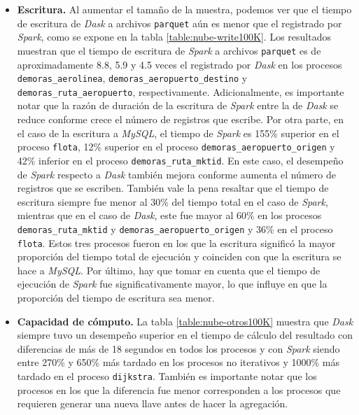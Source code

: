 \begin{itemize}
	\item \textbf{Escritura.} Al aumentar el tamaño de la muestra, podemos ver que el tiempo de escritura de \textit{Dask} a archivos \texttt{parquet} aún es menor que el registrado por \textit{Spark}, como se expone en la tabla \ref{table:nube-write100K}. Los resultados muestran que el tiempo de escritura de \textit{Spark} a archivos \texttt{parquet} es de aproximadamente 8.8, 5.9 y 4.5 veces el registrado por \textit{Dask} en los procesos \texttt{demoras\_aerolinea}, \texttt{demoras\_aeropuerto\_destino} y \texttt{demoras\_ruta\_aeropuerto}, respectivamente. Adicionalmente, es importante notar que la razón de duración de la escritura de \textit{Spark} entre la de \textit{Dask} se reduce conforme crece el número de registros que escribe. Por otra parte, en el caso de la escritura a \textit{MySQL}, el tiempo de \textit{Spark} es 155\% superior en el proceso \texttt{flota}, 12\% superior en el proceso \texttt{demoras\_aeropuerto\_origen} y 42\% inferior en el proceso \texttt{demoras\_ruta\_mktid}. En este caso, el desempeño de \textit{Spark} respecto a \textit{Dask} también mejora conforme aumenta el número de registros que se escriben. También vale la pena resaltar que el tiempo de escritura siempre fue menor al 30\% del tiempo total en el caso de \textit{Spark}, mientras que en el caso de \textit{Dask}, este fue mayor al 60\% en los procesos \texttt{demoras\_ruta\_mktid} y \texttt{demoras\_aeropuerto\_origen} y 36\% en el proceso \texttt{flota}. Estos tres procesos fueron en los que la escritura significó la mayor proporción del tiempo total de ejecución y coinciden con que la escritura se hace a \textit{MySQL}. Por último, hay que tomar en cuenta que el tiempo de ejecución de \textit{Spark} fue significativamente mayor, lo que influye en que la proporción del tiempo de escritura sea menor.
	
	\item \textbf{Capacidad de cómputo.} La tabla \ref{table:nube-otros100K} muestra que \textit{Dask} siempre tuvo un desempeño superior en el tiempo de cálculo del resultado con diferencias de más de 18 segundos en todos los procesos y con \textit{Spark} siendo entre 270\% y 650\% más tardado en los procesos no iterativos y 1000\% más tardado en el proceso \texttt{dijkstra}. También es importante notar que los procesos en los que la diferencia fue menor corresponden a los procesos que requieren generar una nueva llave antes de hacer la agregación.
	

\end{itemize}
